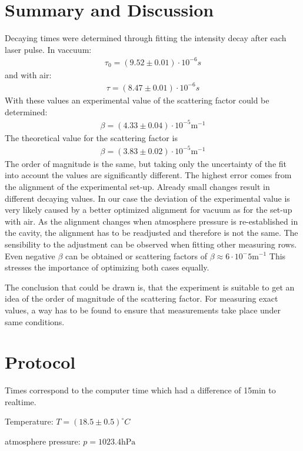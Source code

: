 \documentclass[
	parskip=half,10pt,
	numbers= noenddot, %
	toc=flat, %
	oneside,
	twocolumn,
	]{scrartcl}
\begin{document}
\section{Summary and Discussion}
Decaying times were determined through fitting the intensity decay after each laser pulse. 
In vaccuum:
\begin{align}
\tau_0=(9.52\pm0.01)\cdot 10^{-6}s
\end{align}
and with air:
\begin{align}
\tau=(8.47\pm0.01)\cdot 10^{-6}s
\end{align}
With these values an experimental value of the scattering factor could be determined: 
\begin{align}
\beta=(4.33\pm0.04)\cdot 10^{-5}\si{\meter}^{-1}
\end{align}
The theoretical value for the scattering factor is
\begin{align}
\beta=(3.83\pm0.02)\cdot 10^{-5}\si{\meter}^{-1}
\end{align}
The order of magnitude is the same, but taking only the uncertainty of the fit into account the values are significantly different.
The highest error comes from the alignment of the experimental set-up. Already small changes result in different decaying values. In our case the deviation of the experimental value is very likely caused by a better optimized alignment for vacuum as for the set-up with air. As the alignment changes when atmosphere pressure is re-established in the cavity, the alignment has to be readjusted and therefore is not the same.
The sensibility to the adjustment can be observed when fitting other measuring rows. Even negative $\beta$ can be obtained or scattering factors of $\beta\approx 6 \cdot 10^-5\si{\meter}^{-1}$
This stresses the importance of optimizing both cases equally.

The conclusion that could be drawn is, that the experiment is suitable to get an idea of the order of magnitude of the scattering factor. For measuring exact values, a way has to be found to ensure that measurements take place under same conditions.

\section{Protocol}
Times correspond to the computer time which had a difference of 15min to realtime.

Temperature: $T=(18.5\pm 0.5)^\circ C$

atmosphere pressure: $p=1023.4\si{\hecto \pascal}$\cite{wetter}
\end{document}
